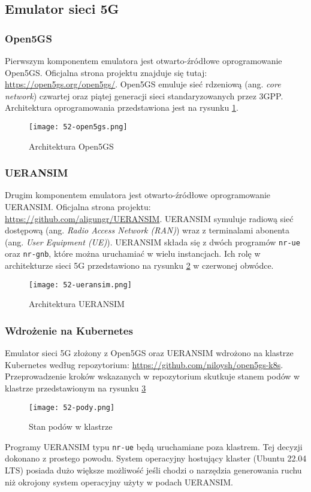 \subsection{Emulator sieci 5G}

\subsubsection{Open5GS}

Pierwszym komponentem emulatora jest otwarto-źródłowe oprogramowanie Open5GS. Oficjalna strona projektu znajduje się tutaj: \url{https://open5gs.org/open5gs/}. Open5GS emuluje sieć rdzeniową (ang. \textit{core network}) czwartej oraz piątej generacji sieci standaryzowanych przez 3GPP. Architektura oprogramowania przedstawiona jest na rysunku \ref{fig:52-open5gs}.

\begin{figure}[!h]
    \centering \texttt{[image: 52-open5gs.png]}
    \caption{Architektura Open5GS}\label{fig:52-open5gs}
\end{figure}

\subsubsection{UERANSIM}

Drugim komponentem emulatora jest otwarto-źródłowe oprogramowanie UERANSIM. Oficjalna strona projektu: \url{https://github.com/aligungr/UERANSIM}. UERANSIM symuluje radiową sieć dostępową (ang. \textit{Radio Access Network (RAN)}) wraz z terminalami abonenta (ang. \textit{User Equipment (UE)}). UERANSIM składa się z dwóch programów \texttt{nr-ue} oraz \texttt{nr-gnb}, które można uruchamiać w wielu instancjach. Ich rolę w architekturze sieci 5G przedstawiono na rysunku \ref{fig:52-ueransim} w czerwonej obwódce.

\begin{figure}[!h]
    \centering \texttt{[image: 52-ueransim.png]}
    \caption{Architektura UERANSIM}\label{fig:52-ueransim}
\end{figure}

\subsubsection{Wdrożenie na Kubernetes}

Emulator sieci 5G złożony z Open5GS oraz UERANSIM wdrożono na klastrze Kubernetes według repozytorium: \url{https://github.com/niloysh/open5gs-k8s}. Przeprowadzenie kroków wskazanych w repozytorium skutkuje stanem podów w klastrze przedstawionym na rysunku \ref{fig:52-pody}

\begin{figure}[!h]
    \centering \texttt{[image: 52-pody.png]}
    \caption{Stan podów w klastrze}\label{fig:52-pody}
\end{figure}

Programy UERANSIM typu \texttt{nr-ue} będą uruchamiane poza klastrem. Tej decyzji dokonano z prostego powodu. System operacyjny hostujący klaster (Ubuntu 22.04 LTS) posiada dużo większe możliwość jeśli chodzi o narzędzia generowania ruchu niż okrojony system operacyjny użyty w podach UERANSIM.
